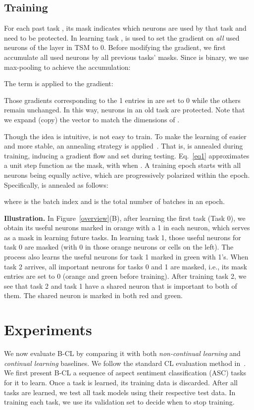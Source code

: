 \documentclass[11pt]{article}
\begin{document}
\subsection{Training} 
For each past task , its mask  indicates which neurons are used by that task and need to be protected. In learning task ,  is used to set the gradient  on \textit{all} used neurons of the layer  in TSM to 0. Before modifying the gradient, we first accumulate all used neurons by all previous tasks' masks.
Since  is binary, we use 
max-pooling to achieve the accumulation:  
\vspace{-1.5mm}




The term  is applied to the gradient:
\vspace{-1.5mm}

Those gradients corresponding to the 1 entries in  are set to 0 while the others remain unchanged. 
In this way, neurons in an old task are protected. 
Note that we expand (copy) the vector  to match the dimensions of .

Though the idea is intuitive,  is not easy to train. To make the learning of  easier and more stable, an annealing strategy is applied~\citep{Serra2018overcoming}. That is,  is annealed during training, inducing a gradient flow and set  during testing. {\color{black}Eq.~\ref{eq1} approximates a unit step function as the mask, with  when . 
A training epoch starts with all neurons being equally active, which are progressively polarized within the epoch. Specifically,  is annealed as follows}:
\vspace{-1.5mm}

where  is the batch index and  is the total number of batches in an epoch.

\textbf{Illustration.} In Figure~\ref{overview}(B), after learning the first task (Task 0), we obtain its useful neurons marked in orange with a 1 in each neuron, which serves as a mask in learning future tasks. In learning task 1, 
those useful neurons for task 0 are masked (with 0 in those orange neurons or cells on the left). The process also learns the useful neurons for task 1 marked in green with 1's. When task 2 arrives, all important neurons for tasks 0 and 1 are masked, i.e., its mask entries are set to 0 (orange and green before training). After training task 2, we see that task 2 and task 1 have a shared neuron that is important to both of them. The shared neuron is marked in both red and green.

\section{Experiments}
We now evaluate B-CL by comparing it with both \textit{non-continual learning} and \textit{continual learning} baselines. We follow the standard CL evaluation method in~\citep{DBLP:journals/corr/abs-1909-08383}.
We first present B-CL a sequence of aspect sentiment classification (ASC) tasks for it to learn. Once a task is learned, its training data is discarded. After all tasks are learned, we test all task models using their respective test data. In training each task, we use its validation set to decide when to stop training. 
\end{document}
